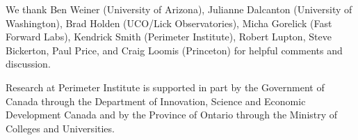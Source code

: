 \documentclass[11pt,letterpaper,linenumbers]{aastex63}
\begin{document}
\acknowledgments

We thank
Ben Weiner (University of Arizona),
Julianne Dalcanton (University of Washington),
Brad Holden (UCO/Lick Observatories),
Micha Gorelick (Fast Forward Labs),
Kendrick Smith (Perimeter Institute),
Robert Lupton, Steve Bickerton, Paul Price, and Craig Loomis (Princeton)
for helpful comments and discussion.

Research at Perimeter Institute is supported in part by the Government
of Canada through the Department of Innovation, Science and Economic
Development Canada and by the Province of Ontario through the Ministry
of Colleges and Universities.





% 
% 
% 
% 
% 
\end{document}
